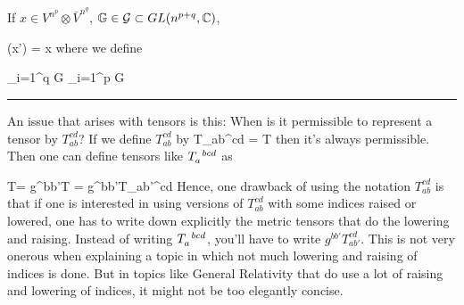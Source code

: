 If $x\in V^{n^p}\otimes \bar{V}^{n^q}$, ${ \mathbb{G}}\in {\cal G}\subset GL(n^{p+q}, { \mathbb{C}})$,

\beq
(x')
=
\GG{}
x
\eeq
where we define

\beq
\GG{}
\eqdef
\prod_{i=1}^q
G
\prod_{i=1}^p
G
\eeq


\hrule
An issue that arises with tensors is this:
When is it permissible to represent 
a tensor by $T_{ab}^{cd}$?
If we define
$T_{ab}^{cd}$  by
\beq
T_{ab}^{cd} = T
\eeq
then it's always permissible.
Then one can define
tensors like
$T\indices{_a^b^c^d}$
as 

\beq
T=
g^{bb'}T
=
g^{bb'}T_{ab'}^{cd}
\eeq
Hence, one drawback of
using the notation
$T_{ab}^{cd}$
is that if one is interested 
in using versions of
$T_{ab}^{cd}$ with
some indices raised or 
lowered, one has to 
write down explicitly the metric tensors 
that do the lowering and
raising.
Instead of writing
$T\indices{_a^b^c^d}$,
you'll have to write
$g^{bb'}T_{ab'}^{cd}$.
This is not very onerous when 
explaining a topic
in which not much
lowering and raising of indices is
done. But in topics like
General Relativity that do
use a lot of raising and lowering of indices, it might not be 
too elegantly concise.

